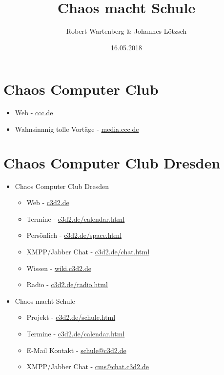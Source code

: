 \documentclass[11pt,a4paper]{article}
\author{\small Robert Wartenberg \& Johannes Lötzsch}
\title{Chaos macht Schule}
\date{16.05.2018}
\begin{document}
\maketitle

\section{Chaos Computer Club}
	\begin{itemize}
		\item Web - \href{https://ccc.de}{ccc.de}
		\item Wahnsinnnig tolle Vortäge - \href{https://media.ccc.de}{media.ccc.de}
	\end{itemize}


\section{Chaos Computer Club Dresden}
\begin{itemize}
	\item Chaos Computer Club Dresden
	\begin{itemize}
		\item Web - \href{https://c3d2.de}{c3d2.de}
		\item Termine - \href{https://c3d2.de/calendar.html}{c3d2.de/calendar.html}
		\item Persönlich - \href{https://c3d2.de/space.html}{c3d2.de/space.html}
		\item XMPP/Jabber Chat - \href{https://c3d2.de/chat.html}{c3d2.de/chat.html}
		\item Wissen - \href{https://wiki.c3d2.de}{wiki.c3d2.de}
		\item Radio - \href{https://c3d2.de/radio.html}{c3d2.de/radio.html}
	\end{itemize}

	\item Chaos macht Schule
	\begin{itemize}
		\item Projekt - \href{https://c3d2.de/schule.html}{c3d2.de/schule.html}
		\item Termine - \href{https://c3d2.de/calendar.html}{c3d2.de/calendar.html}
		\item E-Mail Kontakt - \url{schule@c3d2.de} 
		\item XMPP/Jabber Chat - \url{cms@chat.c3d2.de} 
	\end{itemize}
\end{itemize}
\end{document}
